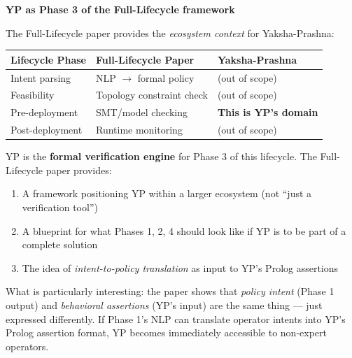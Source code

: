 \begin{analogybox}
\textbf{YP as Phase 3 of the Full-Lifecycle framework}

The Full-Lifecycle paper provides the \emph{ecosystem context} for Yaksha-Prashna:

\begin{center}
\begin{tabular}{lll}
\toprule
\textbf{Lifecycle Phase} & \textbf{Full-Lifecycle Paper} & \textbf{Yaksha-Prashna} \\
\midrule
Intent parsing & NLP $\to$ formal policy & (out of scope) \\
Feasibility & Topology constraint check & (out of scope) \\
Pre-deployment & SMT/model checking & \textbf{This is YP's domain} \\
Post-deployment & Runtime monitoring & (out of scope) \\
\bottomrule
\end{tabular}
\end{center}

YP is the \textbf{formal verification engine} for Phase 3 of this lifecycle. The Full-Lifecycle paper provides:
\begin{enumerate}
  \item A framework positioning YP within a larger ecosystem (not ``just a verification tool'')
  \item A blueprint for what Phases 1, 2, 4 should look like if YP is to be part of a complete solution
  \item The idea of \emph{intent-to-policy translation} as input to YP's Prolog assertions
\end{enumerate}

What is particularly interesting: the paper shows that \emph{policy intent} (Phase 1 output) and \emph{behavioral assertions} (YP's input) are the same thing --- just expressed differently. If Phase 1's NLP can translate operator intents into YP's Prolog assertion format, YP becomes immediately accessible to non-expert operators.
\end{analogybox}

